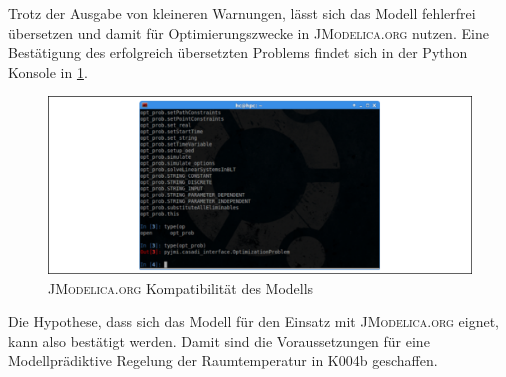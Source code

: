 

Trotz der Ausgabe von kleineren Warnungen, lässt sich das Modell fehlerfrei übersetzen und damit für Optimierungszwecke in \textsc{JModelica.org} nutzen. Eine Bestätigung des erfolgreich übersetzten Problems findet sich in der Python Konsole in \ref{fig:jmod}.

\begin{figure}
\centering
\includegraphics[width=\textwidth]{abbildungen/20160330_mpc}
\caption{\textsc{\textsc{JModelica.org}} Kompatibilität des Modells}
\label{fig:jmod}
\end{figure}

Die Hypothese, dass sich das Modell für den Einsatz mit \textsc{JModelica.org} eignet, kann also bestätigt werden.
Damit sind die Voraussetzungen für eine Modellprädiktive Regelung der Raumtemperatur in K004b geschaffen.